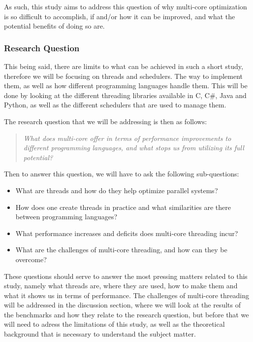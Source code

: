 \documentclass[12pt,a4paper]{article}
\begin{document}
As such, this study aims to address this question of why multi-core optimization is so difficult to accomplish, if and/or how it can be improved, and what the potential benefits of doing so are. 

\subsubsection{Research Question}

This being said, there are limits to what can be achieved in such a short study, therefore we will be focusing on threads and schedulers. The way to implement them, as well as how different programming languages handle them. This will be done by looking at the different threading libraries available in C, C\#, Java and Python, as well as the different schedulers that are used to manage them.

The research question that we will be addressing is then as follows:

\begin{quote}
    \textit{What does multi-core offer in terms of performance improvements to different programming languages, and what stops us from utilizing its full potential?}
\end{quote}

Then to answer this question, we will have to ask the following sub-questions:

\begin{itemize}
    \item What are threads and how do they help optimize parallel systems?
    \item How does one create threads in practice and what similarities are there between programming languages?
    \item What performance increases and deficits does multi-core threading incur?
    \item What are the challenges of multi-core threading, and how can they be overcome?
\end{itemize}

These questions should serve to answer the most pressing matters related to this study, namely what threads are, where they are used, how to make them and what it shows us in terms of performance. The challenges of multi-core threading will be addressed in the discussion section, where we will look at the results of the benchmarks and how they relate to the research question, but before that we will need to adress the limitations of this study, as well as the theoretical background that is necessary to understand the subject matter.
\end{document}
